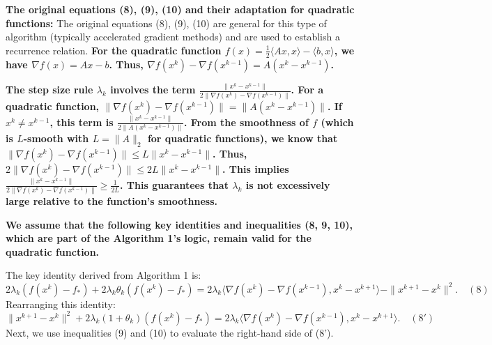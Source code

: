 \documentclass{article}
\begin{document}
\textbf{The original equations (8), (9), (10) and their adaptation for quadratic functions:}
The original equations (8), (9), (10) are general for this type of algorithm (typically accelerated gradient methods) and are used to establish a recurrence relation. \textbf{For the quadratic function $f(x) = \frac{1}{2} \langle Ax, x \rangle - \langle b, x \rangle$, we have $\nabla f(x) = Ax - b$.
Thus, $\nabla f(x^k) - \nabla f(x^{k-1}) = A(x^k - x^{k-1})$.}

\textbf{The step size rule $\lambda_k$ involves the term $\frac{\|x^k - x^{k-1}\|}{2\|\nabla f(x^k) - \nabla f(x^{k-1})\|}$. For a quadratic function, $\|\nabla f(x^k) - \nabla f(x^{k-1})\| = \|A(x^k - x^{k-1})\|$. If $x^k \neq x^{k-1}$, this term is $\frac{\|x^k - x^{k-1}\|}{2\|A(x^k - x^{k-1})\|}$. From the smoothness of $f$ (which is $L$-smooth with $L=\|A\|_2$ for quadratic functions), we know that $\|\nabla f(x^k) - \nabla f(x^{k-1})\| \leq L \|x^k - x^{k-1}\|$. Thus, $2\|\nabla f(x^k) - \nabla f(x^{k-1})\| \leq 2L \|x^k - x^{k-1}\|$. This implies $\frac{\|x^k - x^{k-1}\|}{2\|\nabla f(x^k) - \nabla f(x^{k-1})\|} \geq \frac{1}{2L}$. This guarantees that $\lambda_k$ is not excessively large relative to the function's smoothness.}

\textbf{We assume that the following key identities and inequalities (8, 9, 10), which are part of the Algorithm 1's logic, remain valid for the quadratic function.}

The key identity derived from Algorithm 1 is:
$$ 2\lambda_k(f(x^k) - f_*) + 2\lambda_k\theta_k(f(x^k) - f_*) = 2\lambda_k\langle \nabla f(x^k) - \nabla f(x^{k-1}), x^k - x^{k+1} \rangle - \|x^{k+1} - x^k\|^2. \quad (8) $$
Rearranging this identity:
$$ \|x^{k+1} - x^k\|^2 + 2\lambda_k(1+\theta_k)(f(x^k) - f_*) = 2\lambda_k\langle \nabla f(x^k) - \nabla f(x^{k-1}), x^k - x^{k+1} \rangle. \quad (8') $$
Next, we use inequalities (9) and (10) to evaluate the right-hand side of (8').
\end{document}
